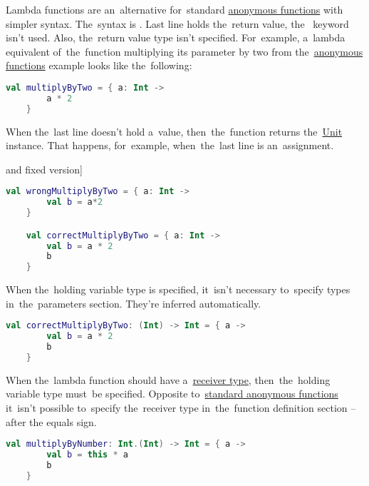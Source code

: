 \label{kotlinlambda}
Lambda functions are an~alternative for~standard \hyperref[kotlinanonymousfunction]{anonymous functions} with simpler syntax.
The~syntax is .
Last line holds the~return value, the~ keyword isn't used.
Also, the~return value type isn't specified.
For~example, a~lambda equivalent of~the~function multiplying its parameter by two from the~\hyperref[kotlinanonymousfunction]{anonymous functions} example looks like the~following:
\begin{lstlisting}[language=Kotlin]
    val multiplyByTwo = { a: Int ->
        a * 2
    }
\end{lstlisting}
\newline

\noindent When the~last line doesn't hold a~value, then~the~function returns the~\hyperref[kotlinunit]{Unit} instance.
That happens, for~example, when~the~last line is an~assignment.

\example[lambda functions wrongly returning \hyperref[kotlinunit]{Unit} and fixed version]
\begin{lstlisting}[language=Kotlin]
    val wrongMultiplyByTwo = { a: Int ->
        val b = a*2
    }

    val correctMultiplyByTwo = { a: Int ->
        val b = a * 2
        b
    }
\end{lstlisting}
\newline

\noindent When the~holding variable type is specified, it~isn't necessary to~specify types in~the~parameters section.
They're inferred automatically.

\begin{lstlisting}[language=Kotlin]
    val correctMultiplyByTwo: (Int) -> Int = { a ->
        val b = a * 2
        b
    }
\end{lstlisting}
\newline

\noindent When the~lambda function should have a~\hyperref[kotlinanonymousreceivertype]{receiver type}, then~the~holding variable type must~be specified.
Opposite to~\hyperref[kotlinanonymousfunction]{standard anonymous functions} it~isn't possible to~specify the~receiver type in~the~function definition section -- after the equals sign.

\begin{lstlisting}[language=Kotlin]
    val multiplyByNumber: Int.(Int) -> Int = { a ->
        val b = this * a
        b
    }
\end{lstlisting}
\newline

